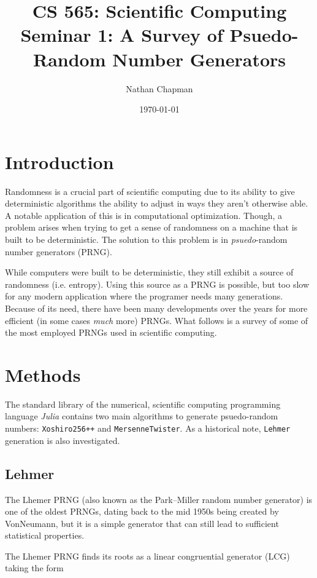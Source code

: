 \documentclass{article}
\title{\vspace*{-0.625in}CS 565: Scientific Computing \\ Seminar 1: A Survey of Psuedo-Random Number Generators}
\author{Nathan Chapman}
\date{\today}
\begin{document}
    \maketitle

    \section*{Introduction}

        Randomness is a crucial part of scientific computing due to its ability to give deterministic algorithms the ability to adjust in ways they aren't otherwise able.  A notable application of this is in computational optimization.  Though, a problem arises when trying to get a sense of randomness on a machine that is built to be deterministic.  The solution to this problem is in \emph{psuedo}-random number generators (PRNG).

        While computers were built to be deterministic, they still exhibit a source of randomness (i.e. entropy).  Using this source as a PRNG is possible, but too slow for any modern application where the programer needs many generations\cite{WhyNotRandomDevice}.  Because of its need, there have been many developments over the years for more efficient (in some cases \emph{much} more) PRNGs.  What follows is a survey of some of the most employed PRNGs used in scientific computing.
    
    \section*{Methods}

        The standard library of the numerical, scientific computing programming language \emph{Julia} contains two main algorithms to generate psuedo-random numbers\cite{Julia-2017}: \texttt{Xoshiro256++} and \texttt{MersenneTwister}.  As a historical note, \texttt{Lehmer} generation is also investigated.

        \subsection*{Lehmer}

            The Lhemer PRNG (also known as the Park–Miller random number generator) is one of the oldest PRNGs, dating back to the mid 1950s being created by VonNeumann, but it is a simple generator that can still lead to sufficient statistical properties.

            The Lhemer PRNG finds its roots as a linear congruential generator (LCG) taking the form
\end{document}

